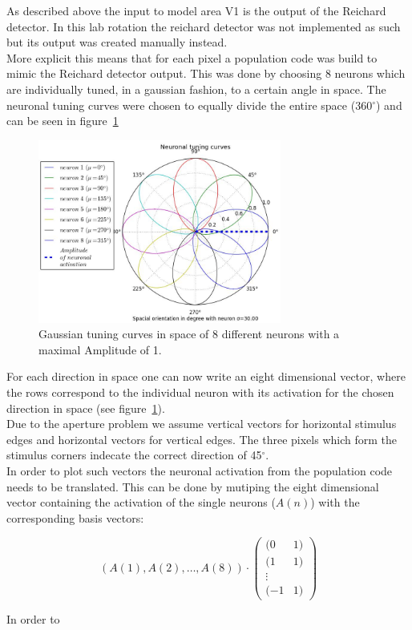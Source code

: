\documentclass[a4paper]{article}
\begin{document}
As described above the input to model area V1 is the output of the Reichard detector.
In this lab rotation the reichard detector was not implemented as such but its output was created manually instead.\\
More explicit this means that for each pixel a population code was build to mimic the Reichard detector output. This was done by choosing 8 neurons which are individually tuned, in a gaussian fashion, to a certain angle in space. The neuronal tuning curves were chosen to equally divide the entire space (360$^{\circ}$) and can be seen in figure~\ref{fig:neuronGauss}

\vspace{0.5cm}
\begin{figure}[ht]
\centering
\includegraphics[width=8cm]{pics/neuronGauss}
\caption{Gaussian tuning curves in space of 8 different neurons with a maximal Amplitude of 1.}
\label{fig:neuronGauss}
\end{figure}
\vspace{0.5cm}

For each direction in space one can now write an eight dimensional vector, where the rows correspond to the individual neuron with its activation for the chosen direction in space (see figure~\ref{fig:neuronGauss}).\\
Due to the aperture problem we assume vertical vectors for horizontal stimulus edges and horizontal vectors for vertical edges. The three pixels which form the stimulus corners indecate the correct direction of 45$^{\circ}$.\\
In order to plot such vectors the neuronal activation from the population code needs to be translated. This can be done by mutiping the eight dimensional vector containing the activation of the single neurons ($A(n)$) with the corresponding basis vectors:

\begin{equation}
\left(A(1),A(2),\hdots, A(8)\right) \cdot \begin{pmatrix} (0&1) \\ (1&1)\\ \vdots\\ (-1&1)\end{pmatrix}
\end{equation}

In order to
\end{document}
